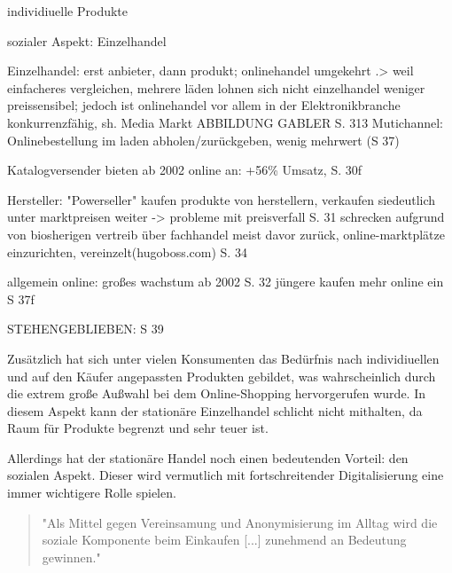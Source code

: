         individiuelle Produkte
        
        sozialer Aspekt: Einzelhandel
        
        Einzelhandel: erst anbieter, dann produkt; onlinehandel umgekehrt
            .> weil einfacheres vergleichen, mehrere läden lohnen sich nicht
            einzelhandel weniger preissensibel; jedoch ist onlinehandel vor allem in der Elektronikbranche konkurrenzfähig, sh. Media Markt\cite[S. 27]{Graf}
            ABBILDUNG GABLER S. 313
        Mutichannel: Onlinebestellung im laden abholen/zurückgeben, wenig mehrwert (S 37) 
            
        {
        Katalogversender bieten ab 2002 online an: +56\% Umsatz, S. 30f
        }
        
        Hersteller: "Powerseller" kaufen produkte von herstellern, verkaufen siedeutlich unter marktpreisen weiter -> probleme mit preisverfall S. 31
        schrecken aufgrund von biosherigen vertreib über fachhandel meist davor zurück, online-marktplätze einzurichten, vereinzelt(hugoboss.com) S. 34
        
        allgemein online: großes wachstum ab 2002 S. 32
            jüngere kaufen mehr online ein S 37f
            
    STEHENGEBLIEBEN: S 39
\fi

Zusätzlich hat sich unter vielen Konsumenten das Bedürfnis nach individiuellen und auf den Käufer angepassten Produkten gebildet\cite[S. 43]{Nitt}, was wahrscheinlich durch die extrem große Außwahl bei dem Online-Shopping hervorgerufen wurde. In diesem Aspekt kann der stationäre Einzelhandel schlicht nicht mithalten, da Raum für Produkte begrenzt und sehr teuer ist. 
\iffalse
> billig - strategie vorallem von amazon und alibaba

veranschaulichung eigene tabelle börsenwert einzelner unternehmen

Dabei gibt es auch unternehmen, die mehrere berieche nutzen, wie amazon
\fi

Allerdings hat der stationäre Handel noch einen bedeutenden Vorteil: den sozialen Aspekt. Dieser wird vermutlich mit fortschreitender Digitalisierung eine immer wichtigere Rolle spielen\cite[S. 50]{Ebert}.
\begin{quote}
"Als Mittel gegen Vereinsamung und Anonymisierung im Alltag wird die soziale Komponente beim Einkaufen [...] zunehmend an Bedeutung gewinnen."\cite[S. 43]{Nitt}
\end{quote}
